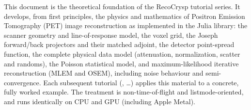 This document is the theoretical foundation of the RecoCrysp tutorial series.
It develops, from first principles, the physics and mathematics of Positron
Emission Tomography (PET) image reconstruction as implemented in the
 Julia library: the scanner geometry and line-of-response
model, the voxel grid, the Joseph forward/back projectors and their matched
adjoint, the detector point-spread function, the complete physical data model
(attenuation, normalization, scatter and randoms), the Poisson statistical
model, and maximum-likelihood iterative reconstruction (MLEM and OSEM),
including noise behaviour and semi-convergence. Each subsequent tutorial
(, \dots) applies this material to a concrete, fully
worked example. The treatment is non-time-of-flight and listmode-oriented, and
runs identically on CPU and GPU (including Apple Metal).
